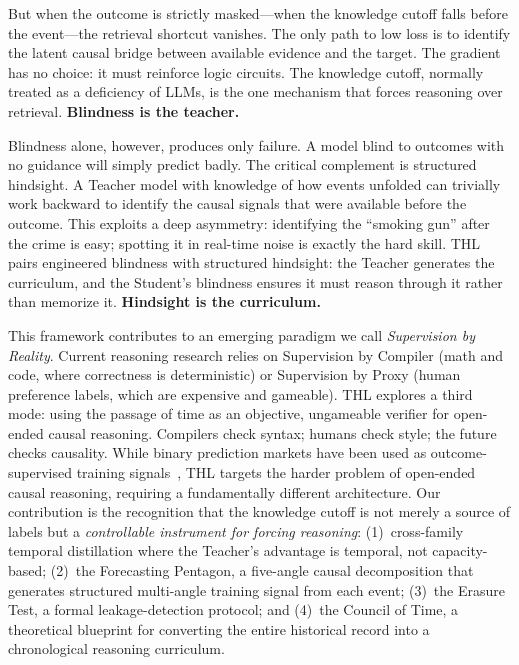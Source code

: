\documentclass[11pt,a4paper]{article}
\begin{document}
But when the outcome is strictly masked---when the knowledge cutoff falls before the event---the retrieval shortcut vanishes. The only path to low loss is to identify the latent causal bridge between available evidence and the target. The gradient has no choice: it must reinforce logic circuits. The knowledge cutoff, normally treated as a deficiency of LLMs, is the one mechanism that forces reasoning over retrieval. \textbf{Blindness is the teacher.}

Blindness alone, however, produces only failure. A model blind to outcomes with no guidance will simply predict badly. The critical complement is structured hindsight. A Teacher model with knowledge of how events unfolded can trivially work backward to identify the causal signals that were available before the outcome. This exploits a deep asymmetry: identifying the ``smoking gun'' after the crime is easy; spotting it in real-time noise is exactly the hard skill. THL pairs engineered blindness with structured hindsight: the Teacher generates the curriculum, and the Student's blindness ensures it must reason through it rather than memorize it. \textbf{Hindsight is the curriculum.}

This framework contributes to an emerging paradigm we call \emph{Supervision by Reality}. Current reasoning research relies on Supervision by Compiler (math and code, where correctness is deterministic) or Supervision by Proxy (human preference labels, which are expensive and gameable). THL explores a third mode: using the passage of time as an objective, ungameable verifier for open-ended causal reasoning. Compilers check syntax; humans check style; the future checks causality. While binary prediction markets have been used as outcome-supervised training signals~\cite{turtel2025selfteach, turtel2025rlvr, turtel2026futureaslabel}, THL targets the harder problem of open-ended causal reasoning, requiring a fundamentally different architecture. Our contribution is the recognition that the knowledge cutoff is not merely a source of labels but a \emph{controllable instrument for forcing reasoning}: (1)~cross-family temporal distillation where the Teacher's advantage is temporal, not capacity-based; (2)~the Forecasting Pentagon, a five-angle causal decomposition that generates structured multi-angle training signal from each event; (3)~the Erasure Test, a formal leakage-detection protocol; and (4)~the Council of Time, a theoretical blueprint for converting the entire historical record into a chronological reasoning curriculum.
\end{document}
